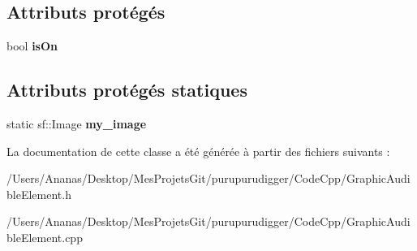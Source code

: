 \subsection*{Attributs protégés}
\begin{DoxyCompactItemize}
\item 
\hypertarget{class_graphic_audible_element_ab0393a89bf30f2ff574b38cc09241ba4}{bool {\bfseries is\-On}}\label{class_graphic_audible_element_ab0393a89bf30f2ff574b38cc09241ba4}

\end{DoxyCompactItemize}
\subsection*{Attributs protégés statiques}
\begin{DoxyCompactItemize}
\item 
\hypertarget{class_graphic_audible_element_accfc407868d33341460d3272561b15d3}{static sf\-::\-Image {\bfseries my\-\_\-image}}\label{class_graphic_audible_element_accfc407868d33341460d3272561b15d3}

\end{DoxyCompactItemize}


La documentation de cette classe a été générée à partir des fichiers suivants \-:\begin{DoxyCompactItemize}
\item 
/\-Users/\-Ananas/\-Desktop/\-Mes\-Projets\-Git/purupurudigger/\-Code\-Cpp/Graphic\-Audible\-Element.\-h\item 
/\-Users/\-Ananas/\-Desktop/\-Mes\-Projets\-Git/purupurudigger/\-Code\-Cpp/Graphic\-Audible\-Element.\-cpp\end{DoxyCompactItemize}
